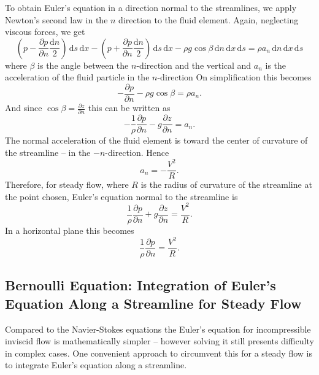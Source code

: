 To obtain Euler's equation in a direction normal to the streamlines, we apply Newton's second law in the $n$ direction to the fluid element. Again, neglecting viscous forces, we get
\[ 
\left( p - \frac{\partial p}{\partial n} \frac{\mathrm{d}n}{2} \right) \, \mathrm{d}s \, \mathrm{d}x  - \left( p + \frac{\partial p}{\partial n} \frac{\mathrm{d}n}{2} \right) \, \mathrm{d}s \, \mathrm{d}x - \rho g \cos \beta \, \mathrm{d}n \, \mathrm{d}x \, \mathrm{d}s = \rho a_n \, \mathrm{d}n \, \mathrm{d}x \, \mathrm{d}s
\]
where $\beta$ is the angle between the $n$-direction and the vertical and $a_n$ is the acceleration of the fluid particle in the $n$-direction
On simplification this becomes
\[ 
- \frac{\partial p}{\partial n} - \rho g \cos \beta = \rho a_n 
.\]
And since $\cos \beta = \frac{\partial z}{\partial n} $ this can be written as
\[ 
- \frac{1}{\rho} \frac{\partial p}{\partial n} - g \frac{\partial z}{\partial n} = a_n
.\]
The normal acceleration of the fluid element is toward the center of curvature of the streamline -- in the $-n$-direction. Hence
\[ 
a_n = - \frac{V^2}{R}
.\]
Therefore, for steady flow, where $R$ is the radius of curvature of the streamline at the point chosen, Euler's equation normal to the streamline is
\[ 
\frac{1}{\rho} \frac{\partial p}{\partial n} + g\frac{\partial z}{\partial n} = \frac{V^2}{R}
.\]
In a horizontal plane this becomes
\[ 
\frac{1}{\rho} \frac{\partial p}{\partial n} = \frac{V^2}{R}
.\]


\subsection{Bernoulli Equation: Integration of Euler's Equation Along a Streamline for Steady Flow}
Compared to the Navier-Stokes equations the Euler's equation for incompressible inviscid flow is mathematically simpler -- however solving it still presents difficulty in complex cases. One convenient approach to circumvent this for a steady flow is to integrate Euler's equation along a streamline.

